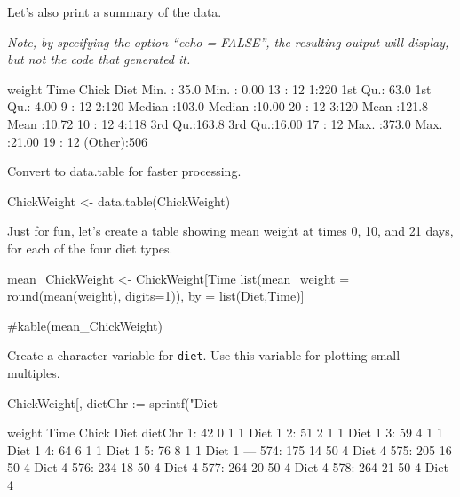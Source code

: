 \documentclass[10pt]{article}
\newenvironment{CodeChunk}{}{}
\begin{document}
Let's also print a summary of the data.

\emph{Note, by specifying the option ``echo = FALSE'', the resulting
output will display, but not the code that generated it.}

\begin{CodeChunk}
\begin{CodeOutput}
     weight           Time           Chick     Diet   
 Min.   : 35.0   Min.   : 0.00   13     : 12   1:220  
 1st Qu.: 63.0   1st Qu.: 4.00   9      : 12   2:120  
 Median :103.0   Median :10.00   20     : 12   3:120  
 Mean   :121.8   Mean   :10.72   10     : 12   4:118  
 3rd Qu.:163.8   3rd Qu.:16.00   17     : 12          
 Max.   :373.0   Max.   :21.00   19     : 12          
                                 (Other):506          
\end{CodeOutput}
\end{CodeChunk}

Convert to data.table for faster processing.

\begin{CodeChunk}
\begin{CodeInput}
ChickWeight <- data.table(ChickWeight)
\end{CodeInput}
\end{CodeChunk}

Just for fun, let's create a table showing mean weight at times 0, 10,
and 21 days, for each of the four diet types.

\begin{CodeInput}
mean_ChickWeight <- ChickWeight[Time %
                                list(mean_weight = round(mean(weight), digits=1)),
                                by = list(Diet,Time)]

#kable(mean_ChickWeight)
\end{CodeInput}

Create a character variable for \texttt{diet}. Use this variable for
plotting small multiples.

\begin{CodeChunk}
\begin{CodeInput}
ChickWeight[, dietChr := sprintf("Diet %
\end{CodeInput}
\begin{CodeOutput}
     weight Time Chick Diet dietChr
  1:     42    0     1    1  Diet 1
  2:     51    2     1    1  Diet 1
  3:     59    4     1    1  Diet 1
  4:     64    6     1    1  Diet 1
  5:     76    8     1    1  Diet 1
 ---                               
574:    175   14    50    4  Diet 4
575:    205   16    50    4  Diet 4
576:    234   18    50    4  Diet 4
577:    264   20    50    4  Diet 4
578:    264   21    50    4  Diet 4
\end{CodeOutput}
\end{CodeChunk}
\end{document}
